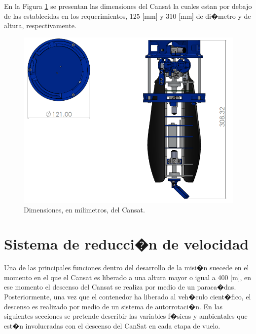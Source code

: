 \documentclass[10pt,a4paper]{book}
\begin{document}
En la Figura \ref{img:DimensionesCansat} se presentan las dimensiones del Cansat la cuales estan por debajo de las establecidas en los requerimientos, 125 [mm] y 310 [mm] de di�metro y de altura, respectivamente.

\begin{figure}[H]
	\centering
		\includegraphics[scale=0.40]{Imagenes/DimensionesCansat.png}
	\caption{Dimensiones, en milimetros, del Cansat.	\label{img:DimensionesCansat}}
\end{figure}



\section*{Sistema de reducci�n de velocidad}
Una de las principales funciones dentro del desarrollo de la misi�n suecede en el momento en el que el Cansat es liberado a una altura mayor o igual a 400 [m], en ese momento el descenso del Cansat se realiza por medio de un paraca�das. Posteriormente, una vez que el contenedor ha liberado al veh�culo cient�fico, el descenso es realizado por medio de un sistema de autorrotaci�n. En las siguientes secciones se pretende describir las variables f�sicas y ambientales que est�n involucradas con el descenso del CanSat en cada etapa de vuelo. 
\end{document}
